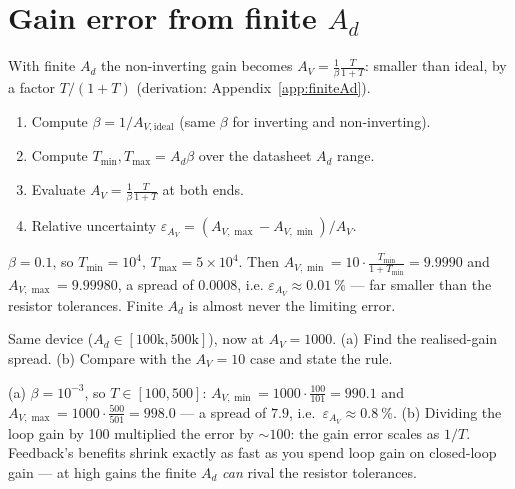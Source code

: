 \documentclass[11pt,a4paper,oneside]{book}
\newcommand{\Ad}{A_d}
\begin{document}
\section{Gain error from finite $\Ad$}
With finite $\Ad$ the non-inverting gain becomes
$A_V=\frac1\beta\frac{T}{1+T}$: smaller than ideal, by a factor $T/(1+T)$
(derivation: Appendix~\ref{app:finiteAd}).

\begin{protocol}[Gain error due to finite $\Ad$]
\begin{enumerate}[leftmargin=1.5cm]
  \item Compute $\beta=1/A_{V,\text{ideal}}$ (same $\beta$ for inverting and
        non-inverting).
  \item Compute $T_{\min},T_{\max}=\Ad\beta$ over the datasheet $\Ad$ range.
  \item Evaluate $A_V=\frac1\beta\frac{T}{1+T}$ at both ends.
  \item Relative uncertainty $\varepsilon_{A_V}=(A_{V,\max}-A_{V,\min})/A_V$.
\end{enumerate}
\end{protocol}

\begin{wexample}[{$A_V=10$ with $\Ad\in[100\text{k},500\text{k}]$}]
$\beta=0.1$, so $T_{\min}=10^4,\,T_{\max}=5\times10^4$. Then
$A_{V,\min}=10\cdot\frac{T_{\min}}{1+T_{\min}}=9.9990$ and $A_{V,\max}=9.99980$,
a spread of $0.0008$, i.e. $\varepsilon_{A_V}\approx\qty{0.01}{\percent}$ ---
far smaller than the resistor tolerances. Finite $\Ad$ is almost never the
limiting error.
\end{wexample}

\begin{exercise}
Same device ($\Ad\in[100\text{k},500\text{k}]$), now at $A_V=1000$. (a) Find the
realised-gain spread. (b) Compare with the $A_V=10$ case and state the rule.
\end{exercise}
\begin{solution}
(a) $\beta=10^{-3}$, so $T\in[100,500]$:
$A_{V,\min}=1000\cdot\frac{100}{101}=990.1$ and
$A_{V,\max}=1000\cdot\frac{500}{501}=998.0$ --- a spread of $7.9$, i.e.\
$\varepsilon_{A_V}\approx\qty{0.8}{\percent}$. (b) Dividing the loop gain by 100
multiplied the error by ${\sim}100$: the gain error scales as $1/T$. Feedback's
benefits shrink exactly as fast as you spend loop gain on closed-loop gain ---
at high gains the finite $\Ad$ \emph{can} rival the resistor tolerances.
\end{solution}
\end{document}
